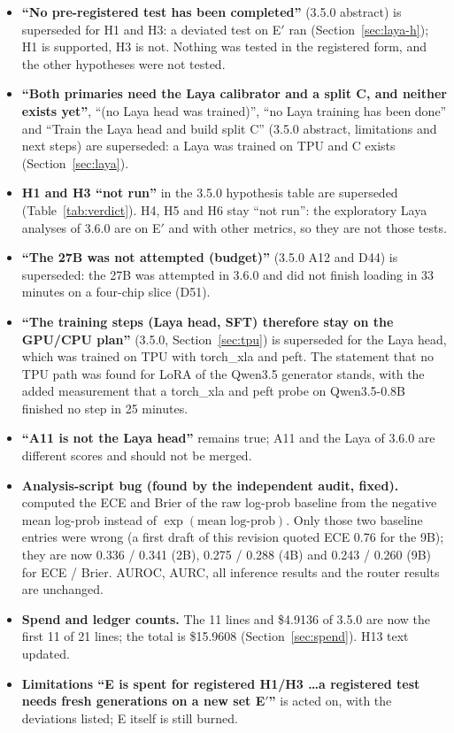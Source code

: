 \documentclass[11pt,a4paper]{article}
\newcommand{\code}[1]{\texttt{\detokenize{#1}}}
\begin{document}
\begin{itemize}
\item \textbf{``No pre-registered test has been completed''} (3.5.0 abstract) is superseded for H1 and H3: a deviated test on E$'$ ran (Section~\ref{sec:laya-h}); H1 is supported, H3 is not. Nothing was tested in the registered form, and the other hypotheses were not tested.
\item \textbf{``Both primaries need the Laya calibrator and a split C, and neither exists yet''}, ``(no Laya head was trained)'', ``no Laya training has been done'' and ``Train the Laya head and build split C'' (3.5.0 abstract, limitations and next steps) are superseded: a Laya was trained on TPU and C exists (Section~\ref{sec:laya}).
\item \textbf{H1 and H3 ``not run''} in the 3.5.0 hypothesis table are superseded (Table~\ref{tab:verdict}). H4, H5 and H6 stay ``not run'': the exploratory Laya analyses of 3.6.0 are on E$'$ and with other metrics, so they are not those tests.
\item \textbf{``The 27B was not attempted (budget)''} (3.5.0 A12 and D44) is superseded: the 27B was attempted in 3.6.0 and did not finish loading in 33 minutes on a four-chip slice (D51).
\item \textbf{``The training steps (Laya head, SFT) therefore stay on the GPU/CPU plan''} (3.5.0, Section~\ref{sec:tpu}) is superseded for the Laya head, which was trained on TPU with torch\_xla and peft. The statement that no TPU path was found for LoRA of the Qwen3.5 generator stands, with the added measurement that a torch\_xla and peft probe on Qwen3.5-0.8B finished no step in 25 minutes.
\item \textbf{``A11 is not the Laya head''} remains true; A11 and the Laya of 3.6.0 are different scores and should not be merged.
\item \textbf{Analysis-script bug (found by the independent audit, fixed).} \code{scripts/analyze_laya.py} computed the ECE and Brier of the raw log-prob baseline from the negative mean log-prob instead of $\exp(\text{mean log-prob})$. Only those two baseline entries were wrong (a first draft of this revision quoted ECE 0.76 for the 9B); they are now 0.336 / 0.341 (2B), 0.275 / 0.288 (4B) and 0.243 / 0.260 (9B) for ECE / Brier. AUROC, AURC, all inference results and the router results are unchanged.
\item \textbf{Spend and ledger counts.} The 11 lines and \$4.9136 of 3.5.0 are now the first 11 of 21 lines; the total is \$15.9608 (Section~\ref{sec:spend}). H13 text updated.
\item \textbf{Limitations ``E is spent for registered H1/H3 \ldots a registered test needs fresh generations on a new set E$'$''} is acted on, with the deviations listed; E itself is still burned.
\end{itemize}
\end{document}
